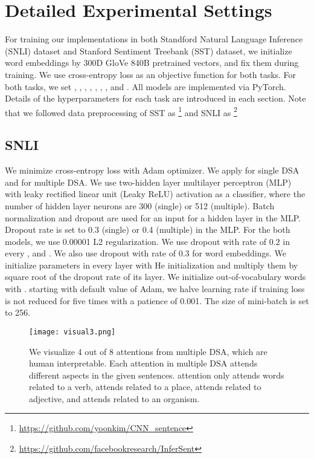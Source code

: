 \documentclass[11pt,a4paper]{article}
\newcommand{\appendixhead}{\centering\textbf{\huge Appendix}
\vspace{0.25in}}
\begin{document}






\twocolumn[\appendixhead]
\section*{Detailed Experimental Settings}\label{supplemn}
\renewcommand{\thesubsection}{\Alph{subsection}}

For training our implementations in both Standford Natural Language Inference (SNLI) dataset and Stanford Sentiment Treebank (SST) dataset, we initialize word embeddings by 300D GloVe 840B pretrained vectors, and fix them during training. We use cross-entropy loss as an objective function for both tasks. For both tasks, we set , , , , , , , and . All models are implemented via PyTorch. Details of the hyperparameters for each task are introduced in each section. Note that we followed data preprocessing of SST as \cite{yoonkim}\footnote{\url{https://github.com/yoonkim/CNN_sentence}} and SNLI as \cite{infersent}\footnote{{\url{https://github.com/facebookresearch/InferSent}}}


\subsection{SNLI}

We minimize cross-entropy loss with Adam optimizer. We apply  for single DSA and  for multiple DSA. We use two-hidden layer multilayer perceptron (MLP) with leaky rectified
linear unit (Leaky ReLU) activation as a classifier, where the number of hidden layer neurons are 300 (single) or 512 (multiple). Batch normalization and dropout are used for an input for a hidden layer in the MLP. Dropout rate is set to 0.3 (single) or 0.4 (multiple) in the MLP. For the both models, we use 0.00001 L2 regularization. We use dropout with rate of 0.2 in every , and . We also use dropout with rate of 0.3 for word embeddings. We initialize parameters in every layer with He initialization  and multiply them by square root of the dropout rate of its layer. We initialize out-of-vocabulary words with . starting with default value of Adam, we halve learning rate if training loss is not reduced for five times with a patience of 0.001. The size of mini-batch is set to 256.

\begin{figure*}
        \centering
        \texttt{[image: visual3.png]}
        \caption{We visualize 4 out of 8 attentions from multiple DSA, which are human interpretable. Each attention in multiple DSA attends different aspects in the given sentences.  attention only attends words related to a verb,  attends related to a place,  attends related to adjective, and  attends related to an organism.}
\end{figure*}
\end{document}
